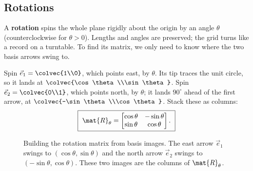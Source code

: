 \subsection{Rotations}
\label{ch05:rotations}

A \textbf{rotation} spins the whole plane rigidly about the origin by an angle
$\theta$ (counterclockwise for $\theta > 0$). Lengths and angles are preserved;
the grid turns like a record on a turntable. To find its matrix, we only need to
know where the two basis arrows swing to.

Spin $\vec{e}_1 = \colvec{1\\0}$, which points east, by $\theta$. Its tip traces
the unit circle, so it lands at $\colvec{\cos\theta\\\sin\theta}$. Spin
$\vec{e}_2 = \colvec{0\\1}$, which points north, by $\theta$; it lands $90^\circ$
ahead of the first arrow, at $\colvec{-\sin\theta\\\cos\theta}$. Stack these as
columns:
\[
  \boxed{\ \mat{R}_\theta
  = \begin{bmatrix} \cos\theta & -\sin\theta \\ \sin\theta & \cos\theta \end{bmatrix}.\ }
\]

\begin{figure}[H]
\centering
{}
\caption{Building the rotation matrix from basis images. The east arrow
$\vec{e}_1$ swings to $(\cos\theta,\sin\theta)$ and the north arrow $\vec{e}_2$
swings to $(-\sin\theta,\cos\theta)$. These two images are the columns of
$\mat{R}_\theta$.}
\label{ch05:fig-rotation}
\end{figure}

